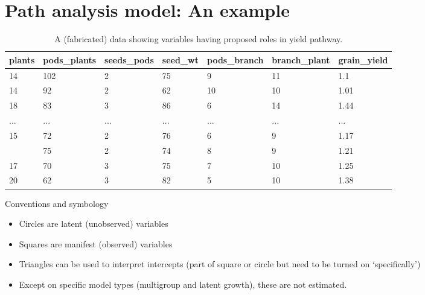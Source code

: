 \documentclass[11pt,dvipsnames,ignorenonframetext,aspectratio=169]{beamer}
\begin{document}
\hypertarget{path-analysis-model-an-example}{%
\section{Path analysis model: An
example}\label{path-analysis-model-an-example}}

\begin{frame}{}
\protect\hypertarget{section-5}{}
\begin{table}

\caption{\label{tab:soydata-preview}A (fabricated) data showing variables having proposed roles in yield pathway.}
\centering
\fontsize{8}{10}\selectfont
\begin{tabular}[t]{lllllll}
\toprule
plants & pods\_plants & seeds\_pods & seed\_wt & pods\_branch & branch\_plant & grain\_yield\\
\midrule
14 & 102 & 2 & 75 & 9 & 11 & 1.1\\
14 & 92 & 2 & 62 & 10 & 10 & 1.01\\
18 & 83 & 3 & 86 & 6 & 14 & 1.44\\
... & ... & ... & ... & ... & ... & ...\\
15 & 72 & 2 & 76 & 6 & 9 & 1.17\\
\addlinespace
19 & 75 & 2 & 74 & 8 & 9 & 1.21\\
17 & 70 & 3 & 75 & 7 & 10 & 1.25\\
20 & 62 & 3 & 82 & 5 & 10 & 1.38\\
\bottomrule
\end{tabular}
\end{table}
\end{frame}

\begin{frame}{Conventions and symbology}
\protect\hypertarget{conventions-and-symbology}{}
\begin{itemize}
\item
  Circles are latent (unobserved) variables
\item
  Squares are manifest (observed) variables
\item
  Triangles can be used to interpret intercepts (part of square or
  circle but need to be turned on `specifically')
\item
  Except on specific model types (multigroup and latent growth), these
  are not estimated.
\end{itemize}
\end{frame}
\end{document}
